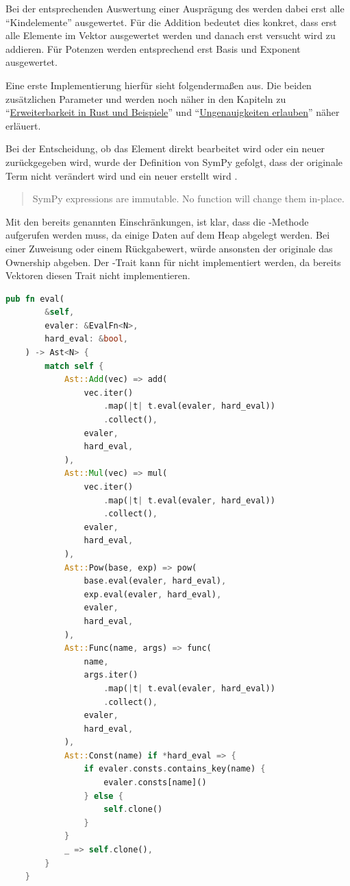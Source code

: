 \documentclass[11pt,a4paper, ngerman]{article}
\begin{document}
Bei der entsprechenden Auswertung einer Ausprägung des  werden dabei erst alle ``Kindelemente'' ausgewertet. Für die Addition bedeutet dies konkret, dass erst alle Elemente im Vektor ausgewertet werden und danach erst versucht wird zu addieren. Für Potenzen werden entsprechend erst Basis und Exponent ausgewertet.

Eine erste Implementierung hierfür sieht folgendermaßen aus. Die beiden zusätzlichen Parameter  und  werden noch näher in den Kapiteln zu ``\hyperref[sec:kapErRustUndBei]{Erweiterbarkeit in Rust und Beispiele}'' und ``\hyperref[sec:ungenauigkeitenKapitel]{Ungenauigkeiten erlauben}'' näher erläuert.

Bei der Entscheidung, ob das Element direkt bearbeitet wird oder ein neuer  zurückgegeben wird, wurde der Definition von SymPy gefolgt, dass der originale Term nicht verändert wird und ein neuer erstellt wird \cite{SymPySubs}.

\begin{quote}
    SymPy expressions are immutable. No function will change them in-place.
\end{quote}

Mit den bereits genannten Einschränkungen, ist klar, dass die -Methode aufgerufen werden muss, da einige Daten auf dem Heap abgelegt werden. Bei einer Zuweisung oder einem Rückgabewert, würde ansonsten der originale  das Ownership abgeben. Der -Trait kann für  nicht implementiert werden, da bereits Vektoren diesen Trait nicht implementieren.

\begin{lstlisting}[language=rust, caption={eval-Methode 1. Implementierung}]
    pub fn eval(
        &self,
        evaler: &EvalFn<N>,
        hard_eval: &bool,
    ) -> Ast<N> {
        match self {
            Ast::Add(vec) => add(
                vec.iter()
                    .map(|t| t.eval(evaler, hard_eval))
                    .collect(),
                evaler,
                hard_eval,
            ),
            Ast::Mul(vec) => mul(
                vec.iter()
                    .map(|t| t.eval(evaler, hard_eval))
                    .collect(),
                evaler,
                hard_eval,
            ),
            Ast::Pow(base, exp) => pow(
                base.eval(evaler, hard_eval),
                exp.eval(evaler, hard_eval),
                evaler,
                hard_eval,
            ),
            Ast::Func(name, args) => func(
                name,
                args.iter()
                    .map(|t| t.eval(evaler, hard_eval))
                    .collect(),
                evaler,
                hard_eval,
            ),
            Ast::Const(name) if *hard_eval => {
                if evaler.consts.contains_key(name) {
                    evaler.consts[name]()
                } else {
                    self.clone()
                }
            }
            _ => self.clone(),
        }
    }
\end{lstlisting}
\end{document}

